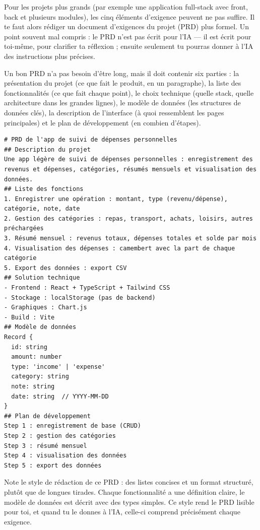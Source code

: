 Pour les projets plus grands (par exemple une application full-stack avec front, back et plusieurs modules), les cinq éléments d'exigence peuvent ne pas suffire. Il te faut alors rédiger un document d'exigences du projet (PRD) plus formel. Un point souvent mal compris : le PRD n'est pas écrit pour l'IA — il est écrit pour toi-même, pour clarifier ta réflexion ; ensuite seulement tu pourras donner à l'IA des instructions plus précises.

Un bon PRD n'a pas besoin d'être long, mais il doit contenir six parties : la présentation du projet (ce que fait le produit, en un paragraphe), la liste des fonctionnalités (ce que fait chaque point), le choix technique (quelle stack, quelle architecture dans les grandes lignes), le modèle de données (les structures de données clés), la description de l'interface (à quoi ressemblent les pages principales) et le plan de développement (en combien d'étapes).

\begin{lstlisting}
# PRD de l'app de suivi de dépenses personnelles
## Description du projet
Une app légère de suivi de dépenses personnelles : enregistrement des revenus et dépenses, catégories, résumés mensuels et visualisation des données.
## Liste des fonctions
1. Enregistrer une opération : montant, type (revenu/dépense), catégorie, note, date
2. Gestion des catégories : repas, transport, achats, loisirs, autres préchargées
3. Résumé mensuel : revenus totaux, dépenses totales et solde par mois
4. Visualisation des dépenses : camembert avec la part de chaque catégorie
5. Export des données : export CSV
## Solution technique
- Frontend : React + TypeScript + Tailwind CSS
- Stockage : localStorage (pas de backend)
- Graphiques : Chart.js
- Build : Vite
## Modèle de données
Record {
  id: string
  amount: number
  type: 'income' | 'expense'
  category: string
  note: string
  date: string  // YYYY-MM-DD
}
## Plan de développement
Step 1 : enregistrement de base (CRUD)
Step 2 : gestion des catégories
Step 3 : résumé mensuel
Step 4 : visualisation des données
Step 5 : export des données
\end{lstlisting}

Note le style de rédaction de ce PRD : des listes concises et un format structuré, plutôt que de longues tirades. Chaque fonctionnalité a une définition claire, le modèle de données est décrit avec des types simples. Ce style rend le PRD lisible pour toi, et quand tu le donnes à l'IA, celle-ci comprend précisément chaque exigence.


